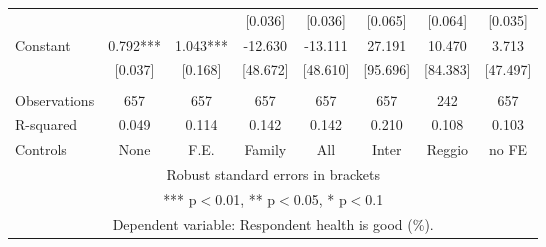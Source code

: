 \begin{tabular}{lccccccc}
 &  &  & [0.036] & [0.036] & [0.065] & [0.064] & [0.035] \\
Constant & 0.792*** & 1.043*** & -12.630 & -13.111 & 27.191 & 10.470 & 3.713 \\
 & [0.037] & [0.168] & [48.672] & [48.610] & [95.696] & [84.383] & [47.497] \\
 &  &  &  &  &  &  &  \\
Observations & 657 & 657 & 657 & 657 & 657 & 242 & 657 \\
R-squared & 0.049 & 0.114 & 0.142 & 0.142 & 0.210 & 0.108 & 0.103 \\
 Controls & None & F.E. & Family & All & Inter & Reggio & no FE \\ \hline
\multicolumn{8}{c}{ Robust standard errors in brackets} \\
\multicolumn{8}{c}{ *** p$<$0.01, ** p$<$0.05, * p$<$0.1} \\
\multicolumn{8}{c}{ Dependent variable: Respondent health is good (\%).} \\
\end{tabular}
